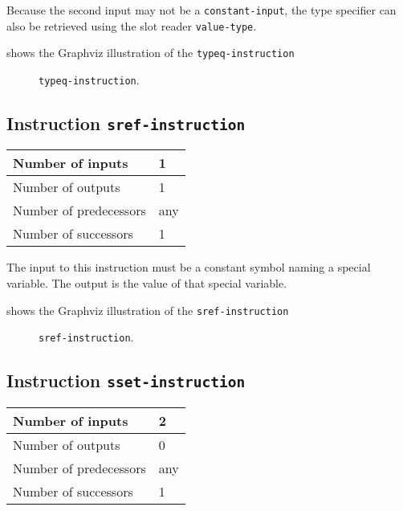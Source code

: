 Because the second input may not be a \texttt{constant-input}, the
type specifier can also be retrieved using the slot reader
\texttt{value-type}. 

 shows the Graphviz illustration of the
\texttt{typeq-instruction}

\begin{figure}
\begin{center}
\end{center}
\caption{\label{fig-typeq-instruction}
\texttt{typeq-instruction}.}
\end{figure}

\subsection{Instruction \texttt{sref-instruction}}
\label{mir-instruction-sref}

\begin{tabular}{|l|l|}
\hline
Number of inputs & 1\\
\hline
Number of outputs & 1\\
\hline
Number of predecessors & any\\
\hline
Number of successors & 1\\
\hline
\end{tabular}

The input to this instruction must be a constant symbol naming a
special variable.  The output is the value of that special variable.

 shows the Graphviz illustration of the
\texttt{sref-instruction}

\begin{figure}
\begin{center}
\end{center}
\caption{\label{fig-sref-instruction}
\texttt{sref-instruction}.}
\end{figure}

\subsection{Instruction \texttt{sset-instruction}}
\label{mir-instruction-sset}

\begin{tabular}{|l|l|}
\hline
Number of inputs & 2\\
\hline
Number of outputs & 0\\
\hline
Number of predecessors & any\\
\hline
Number of successors & 1\\
\hline
\end{tabular}

